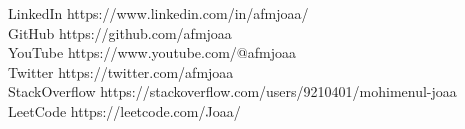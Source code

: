 
\horizontalLineLeft

\profileItem
    {\faLinkedin}
    {LinkedIn}
    {https://www.linkedin.com/in/afmjoaa/} \\
\profileItem
    {\faGithub}
    {GitHub}
    {https://github.com/afmjoaa} \\
\profileItem
    {\faYoutube}
    {YouTube}
    {https://www.youtube.com/@afmjoaa} \\
\profileItem
    {\faTwitter}
    {Twitter}
    {https://twitter.com/afmjoaa} \\
\profileItem
    {\faStackOverflow}
    {StackOverflow}
    {https://stackoverflow.com/users/9210401/mohimenul-joaa} \\
\profileItem
    {\faCode}
    {LeetCode}
    {https://leetcode.com/Joaa/}